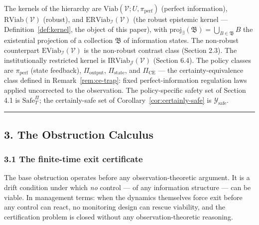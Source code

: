 \documentclass[11pt]{article}
\theoremstyle{definition}
\begin{document}
The kernels of the hierarchy are
\(\mathrm{Viab}(\mathcal{V}; U, \pi_{\mathrm{perf}})\) (perfect
information), \(\mathrm{RViab}(\mathcal{V})\) (robust), and
\(\mathrm{ERViab}_{\mathcal{I}}(\mathcal{V})\) (the robust epistemic
kernel --- Definition~\ref{def:kernel}, the object of this paper), with
\(\mathrm{proj}_{\exists}(\mathfrak{B}) = \bigcup_{B \in \mathfrak{B}} B\)
the existential projection of a collection \(\mathfrak{B}\) of
information states. The non-robust counterpart
\(\mathrm{EViab}_{\mathcal{I}}(\mathcal{V})\) is the non-robust contrast class (Section 2.3). The institutionally restricted kernel is \(\mathrm{IRViab}_{\mathcal{J}}(\mathcal{V})\) (Section 6.4). The policy classes
are \(\pi_{\mathrm{perf}}\) (state feedback), \(\Pi_{\mathrm{output}}\),
\(\Pi_{\mathrm{state}}\), and \(\Pi_{\mathrm{CE}}\) --- the
certainty-equivalence class defined in Remark~\ref{rem:ce-trap}: fixed
perfect-information regulation laws applied uncorrected to the
observation. The policy-specific safety set of Section 4.1 is
\(\mathrm{Safe}^{\Pi}_T\); the certainly-safe set of Corollary~\ref{cor:certainly-safe} is
\(\mathcal{Y}_{\mathrm{safe}}\).

\begin{center}\rule{0.5\linewidth}{0.5pt}\end{center}

\subsection{3. The Obstruction Calculus}\label{the-obstruction-calculus}

\subsubsection{3.1 The finite-time exit
certificate}\label{the-finite-time-exit-certificate}

The base obstruction operates before any observation-theoretic argument.
It is a drift condition under which \emph{no} control --- of any
information structure --- can be viable. In management terms: when the
dynamics themselves force exit before any control can react, no
monitoring design can rescue viability, and the certification problem is
closed without any observation-theoretic reasoning.
\end{document}
